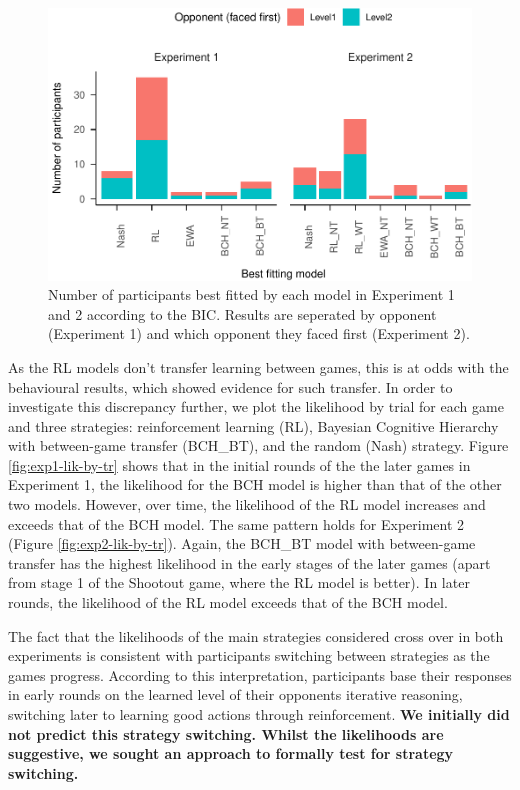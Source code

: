 \documentclass[smallextended]{svjour3}       %
\begin{document}
\begin{figure}

{\centering \includegraphics[width=\textwidth]{CBB_v2_files/figure-latex/exp-comp-models-1} 

}

\caption{Number of participants best fitted by each model  in Experiment 1 and 2 according to the BIC. Results are seperated by opponent (Experiment 1) and which opponent they faced first (Experiment 2).}\label{fig:exp-comp-models}
\end{figure}

As the RL models don't transfer learning between games, this is at odds
with the behavioural results, which showed evidence for such transfer.
In order to investigate this discrepancy further, we plot the likelihood
by trial for each game and three strategies: reinforcement learning
(RL), Bayesian Cognitive Hierarchy with between-game transfer (BCH\_BT),
and the random (Nash) strategy. Figure \ref{fig:exp1-lik-by-tr} shows
that in the initial rounds of the the later games in Experiment 1, the
likelihood for the BCH model is higher than that of the other two
models. However, over time, the likelihood of the RL model increases and
exceeds that of the BCH model. The same pattern holds for Experiment 2
(Figure \ref{fig:exp2-lik-by-tr}). Again, the BCH\_BT model with
between-game transfer has the highest likelihood in the early stages of
the later games (apart from stage 1 of the Shootout game, where the RL
model is better). In later rounds, the likelihood of the RL model
exceeds that of the BCH model.

The fact that the likelihoods of the main strategies considered cross
over in both experiments is consistent with participants switching
between strategies as the games progress. According to this
interpretation, participants base their responses in early rounds on the
learned level of their opponents iterative reasoning, switching later to
learning good actions through reinforcement. \textbf{We initially did
not predict this strategy switching. Whilst the likelihoods are
suggestive, we sought an approach to formally test for strategy
switching.}
\end{document}
